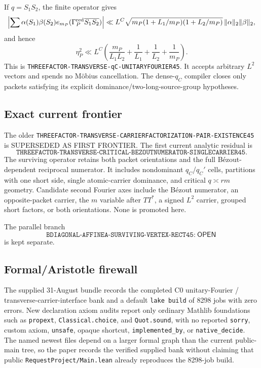 \documentclass[11pt]{article}
\theoremstyle{definition}
\newcommand{\1}{\mathbf 1}
\newcommand{\status}[1]{\textsf{#1}}
\begin{document}
If $q=S_1S_2$, the finite operator gives
\[
\left|\sum\alpha(S_1)\beta(S_2)e_{m_P}(\Gamma_P^{\rm red}\overline{S_1}\overline{S_2})\right|
\ll L^C\sqrt{m_P(1+L_1/m_P)(1+L_2/m_P)}\,\|\alpha\|_2\|\beta\|_2,
\]
and hence
\[
\boxed{\eta_P^2\ll L^C\left(\frac{m_P}{L_1L_2}+\frac1{L_1}+\frac1{L_2}+\frac1{m_P}\right)}.
\]
This is \texttt{THREEFACTOR-TRANSVERSE-qC-UNITARYFOURIER45}. It accepts arbitrary $L^2$
vectors and spends no M\"obius cancellation. The dense-$q_C$ compiler closes only packets
satisfying its explicit dominance/two-long-source-group hypotheses.

\subsection{Exact current frontier}
The older \texttt{THREEFACTOR-TRANSVERSE-CARRIERFACTORIZATION-PAIR-EXISTENCE45} is
\status{SUPERSEDED AS FIRST FRONTIER}. The first current analytic residual is
\[
\boxed{\texttt{THREEFACTOR-TRANSVERSE-CRITICAL-BEZOUTNUMERATOR-SINGLECARRIER45}}.
\]
The surviving operator retains both packet orientations and the full B\'ezout-dependent
reciprocal numerator. It includes nondominant $q_C$/$q_C'$ cells, partitions with one short
side, single atomic-carrier dominance, and critical $q\asymp rm$ geometry. Candidate second
Fourier axes include the B\'ezout numerator, an opposite-packet carrier, the $m$ variable
after $TT^*$, a signed $L^2$ carrier, grouped short factors, or both orientations. None is
promoted here.

The parallel branch
\[
\boxed{\texttt{BDIAGONAL-AFFINEA-SURVIVING-VERTEX-RECT45}:\ \status{OPEN}}
\]
is kept separate.

\subsection{Formal/Aristotle firewall}
The supplied 31-August bundle records the completed C0 unitary-Fourier /
transverse-carrier-interface bank and a default \texttt{lake build} of 8298 jobs with zero
errors. New declaration axiom audits report only ordinary Mathlib foundations such as
\texttt{propext}, \texttt{Classical.choice}, and \texttt{Quot.sound}, with no reported
\texttt{sorry}, custom axiom, \texttt{unsafe}, opaque shortcut, \texttt{implemented\_by}, or
\texttt{native\_decide}. The named newest files depend on a larger formal graph than the
current public-main tree, so the paper records the verified supplied bank without claiming
that public \texttt{RequestProject/Main.lean} already reproduces the 8298-job build.
\end{document}

